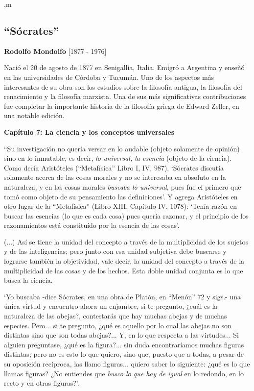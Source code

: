 \documentclass{article}
\begin{document}
\newpage ,m
    
\subsection{``Sócrates''}
    
\begin{center}
    \large{\textbf{Rodolfo Mondolfo} [1877 - 1976]} 
\end{center}
    Nació el 20 de agosto de 1877 en Senigallia, Italia. Emigró a Argentina y enseñó en las universidades de Córdoba y Tucumán. Uno de los aspectos más interesantes de su obra son los estudios sobre la filosofía antigua, la filosofía del renacimiento y la filosofía marxista. Una de sus más significativas contribuciones fue completar la importante historia de la filosofía griega de Edward Zeller, en una notable edición. \par 
    
\begin{center}
    \large{\textbf{Capítulo 7: La ciencia y los conceptos universales}}
\end{center}
    
    ``Su investigación no quería versar en lo audable (objeto solamente de opinión) sino  en lo inmutable, es decir, \emph{lo universal, la esencia} (objeto de la ciencia). Como decía Aristóteles (``Metafísica'' Libro I, IV, 987), `Sócrates discutía solamente acerca de las cosas morales y no se interesaba en absoluto en la naturaleza; y en las cosas morales \emph{buscaba lo universal}, pues fue el primero que tomó como objeto de su pensamiento las definiciones'. Y agrega Aristóteles en otro lugar de la ``Metafísica'' (Libro XIII, Capítulo IV, 1078): `Tenía razón en buscar las esencias (lo que es cada cosa) pues quería razonar, y el principio de los razonamientos está constituído por la esencia de las cosas'. \par
    
    (...) Así se tiene la unidad del concepto a través de la multiplicidad de los sujetos y de las inteligencias; pero junto con esa unidad subjetiva debe buscarse y lograrse también la objetividad, vale decir, la unidad del concepto a través de la multiplicidad de las cosas y de los hechos. Esta doble unidad conjunta es lo que busca la ciencia. \par

        \setlength{\leftskip}{3em}
        \noindent `Yo buscaba -dice Sócrates, en una obra de Platón, en ``Menón'' 72 y sigs.- una única virtud y encuentro ahora un enjambre, si te pregunto, ¿cuál es la naturaleza de las abejas?, contestarás que hay muchas abejas y de muchas especies. Pero... si te pregunto, ¿qué es aquello por lo cual las abejas no son distintas sino que son todas abejas?... Y, en lo que respecta a las virtudes... Si alguien preguntase, ¿qué es la figura?... sin duda encontraríamos muchas figuras distintas; pero no es esto lo que quiero, sino que, puesto que a todas, a pesar de su oposición recíproca, las llamo figuras... quiero saber lo siguiente: ¿qué es lo que llamas figuras? ¿No entiendes que \emph{busco lo que hay de igual} en lo redondo, en lo recto y en otras figuras?'. \par
    
\end{document}
